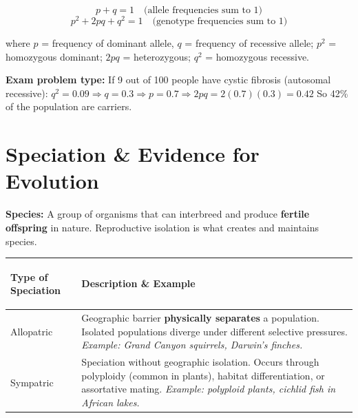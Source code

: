 \documentclass[11pt, letterpaper]{article}
\begin{document}
\[
  p + q = 1 \quad \text{(allele frequencies sum to 1)}
\]
\[
  p^2 + 2pq + q^2 = 1 \quad \text{(genotype frequencies sum to 1)}
\]

where $p$ = frequency of dominant allele, $q$ = frequency of recessive allele; $p^2$ =
homozygous dominant; $2pq$ = heterozygous; $q^2$ = homozygous recessive.

\begin{tcolorbox}[colback=part2bg, colframe=sectiongreen, arc=3pt, boxrule=1pt]
\textbf{Exam problem type:} If 9 out of 100 people have cystic fibrosis (autosomal recessive):
$q^2 = 0.09 \Rightarrow q = 0.3 \Rightarrow p = 0.7 \Rightarrow 2pq = 2(0.7)(0.3) = 0.42$
So 42\% of the population are carriers.
\end{tcolorbox}

\section*{Speciation \& Evidence for Evolution}

\textbf{Species:} A group of organisms that can interbreed and produce \textbf{fertile offspring}
in nature. Reproductive isolation is what creates and maintains species.

\noindent
{\renewcommand{\arraystretch}{1.5}
\begin{tabularx}{\textwidth}{>{\bfseries\raggedright\arraybackslash}p{4cm}
                              >{\raggedright\arraybackslash}X}
\toprule
\rowcolor{tableheadergreen}
\textbf{Type of Speciation} & \textbf{Description \& Example} \\
\midrule
\rowcolor{rowA} Allopatric & Geographic barrier \textbf{physically separates} a population. Isolated populations diverge under different selective pressures. \textit{Example: Grand Canyon squirrels, Darwin's finches.} \\
\rowcolor{rowBg} Sympatric & Speciation without geographic isolation. Occurs through polyploidy (common in plants), habitat differentiation, or assortative mating. \textit{Example: polyploid plants, cichlid fish in African lakes.} \\
\bottomrule
\end{tabularx}}
\end{document}

